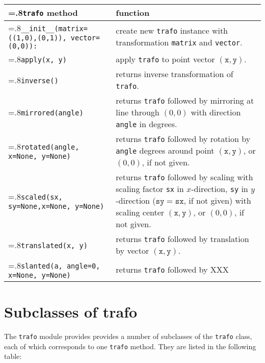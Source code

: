 \medskip
\begin{tabularx}{\linewidth}{>{\hsize=.8\hsize}X>{\raggedright\arraybackslash\hsize=1.2\hsize}X}
\texttt{trafo} method & function \\
\hline
\texttt{\_\_init\_\_(matrix=((1,0),(0,1)),\newline
\phantom{\_\_init\_\_(}vector=(0,0)):} & create new \texttt{trafo}
instance with transformation \texttt{matrix} and \texttt{vector}.
\\
\texttt{apply(x, y)} & apply \texttt{trafo} to point vector
$(\mathtt{x}, \mathtt{y})$.\\
\texttt{inverse()} & returns inverse transformation of
\texttt{trafo}.\\
\texttt{mirrored(angle)} & returns \texttt{trafo} followed by mirroring
at line through $(0,0)$ with  direction \texttt{angle} in degrees.\\
\texttt{rotated(angle, \newline\phantom{rotate(}x=None, y=None)} &
returns \texttt{trafo} followed by rotation by \texttt{angle} degrees
around point $(\mathtt{x},
\mathtt{y})$, or $(0,0)$, if not given.\\
\texttt{scaled(sx, sy=None,\newline\phantom{scale(}x=None, y=None)} &
returns \texttt{trafo} followed by
scaling with scaling factor \texttt{sx} in $x$-direction, \texttt{sy} in
$y$-direction ($\mathtt{sy}=\mathtt{sx}$, if not given) with scaling
center $(\mathtt{x}, \mathtt{y})$, or $(0,0)$, if not given.\\
\texttt{translated(x, y)} & returns \texttt{trafo} followed by
translation by vector $(\mathtt{x}, \mathtt{y})$.\\
\texttt{slanted(a, angle=0, x=None, y=None)} & returns \texttt{trafo}
followed by XXX\\
\end{tabularx}
\medskip



\section{Subclasses of trafo}

The \verb|trafo| module provides provides a number of subclasses of
the \verb|trafo| class, each of which corresponds to one \verb|trafo|
method. They are listed in the following table:

